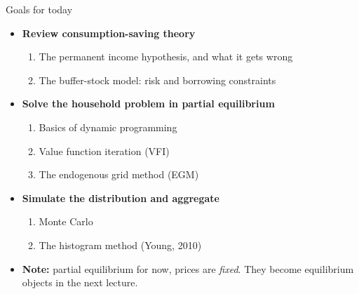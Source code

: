 \documentclass[
  10pt,
  ignorenonframetext,
  aspectratio=43,
  english,
]{beamer}
\providecommand{\tightlist}{%
  \setlength{\itemsep}{0pt}\setlength{\parskip}{0pt}}
\begin{document}
\begin{frame}{Goals for today}
\protect{}\label{goals-for-today}
\begin{itemize}
\tightlist
\item
  \textbf{Review consumption-saving theory}

  \begin{enumerate}
  \tightlist
  \item
    The permanent income hypothesis, and what it gets wrong
  \item
    The buffer-stock model: risk and borrowing constraints
  \end{enumerate}
\item
  \textbf{Solve the household problem in partial equilibrium}

  \begin{enumerate}
  \tightlist
  \item
    Basics of dynamic programming
  \item
    Value function iteration (VFI)
  \item
    The endogenous grid method (EGM)
  \end{enumerate}
\item
  \textbf{Simulate the distribution and aggregate}

  \begin{enumerate}
  \tightlist
  \item
    Monte Carlo
  \item
    The histogram method (Young, 2010)
  \end{enumerate}
\item
  \textbf{Note:} partial equilibrium for now, prices are \emph{fixed}.
  They become equilibrium objects in the next lecture.
\end{itemize}
\end{frame}
\end{document}
